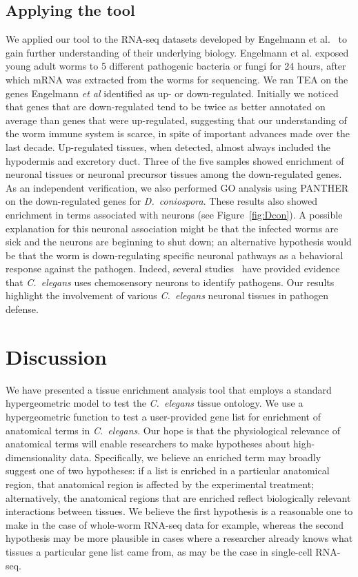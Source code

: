 \subsection*{Applying the tool}
We applied our tool to the RNA-seq datasets developed by Engelmann et
al.~\cite{Engelmann2011} to gain further understanding of their underlying
biology. Engelmann et al. exposed young adult worms to 5 different pathogenic
bacteria or fungi for 24 hours, after which mRNA was extracted from the worms
for sequencing. We ran TEA on the genes Engelmann \emph{et al} identified as
up- or down-regulated. Initially we noticed that genes that are down-regulated
tend to be twice as better annotated on average than genes that were up-regulated,
suggesting that our understanding of the worm immune system is scarce, in spite
of important advances made over the last decade. Up-regulated tissues, when
detected, almost always included the hypodermis and excretory duct. Three of the
five samples showed enrichment of neuronal tissues or neuronal precursor tissues
among the down-regulated genes. As an independent verification, we also
performed GO analysis using PANTHER on the down-regulated genes for
\emph{D.~coniospora}. These results also showed enrichment in terms associated
with neurons (see Figure~\ref{fig:Dcon}). A possible explanation for this
neuronal association might be that the infected worms are sick and the neurons
are beginning to shut down; an alternative hypothesis would be that the worm is
down-regulating specific neuronal pathways as a behavioral response against the
pathogen. Indeed, several studies~\cite{Meisel2014, Zhang2005} have provided
evidence that \emph{C.~elegans} uses chemosensory neurons to identify pathogens.
Our results highlight the involvement of various \emph{C.~elegans} neuronal
tissues in pathogen defense.

\section*{Discussion}
We have presented a tissue enrichment analysis tool that employs a standard
hypergeometric model to test the \emph{C.~elegans} tissue ontology. We use a
hypergeometric function to test a user-provided gene list for enrichment of
anatomical terms in \emph{C.~elegans}. Our hope is that the physiological
relevance of anatomical terms will enable researchers to make hypotheses about
high-dimensionality data. Specifically, we believe an enriched term may broadly
suggest one of two hypotheses: if a list is enriched in a particular anatomical
region, that anatomical region is affected by the experimental treatment;
alternatively, the anatomical regions that are enriched reflect biologically
relevant interactions between tissues. We believe the first hypothesis is a
reasonable one to make in the case of whole-worm RNA-seq data for example,
whereas the second hypothesis may be more plausible in cases where a researcher
already knows what tissues a particular gene list came from, as may be the case
in single-cell RNA-seq.

